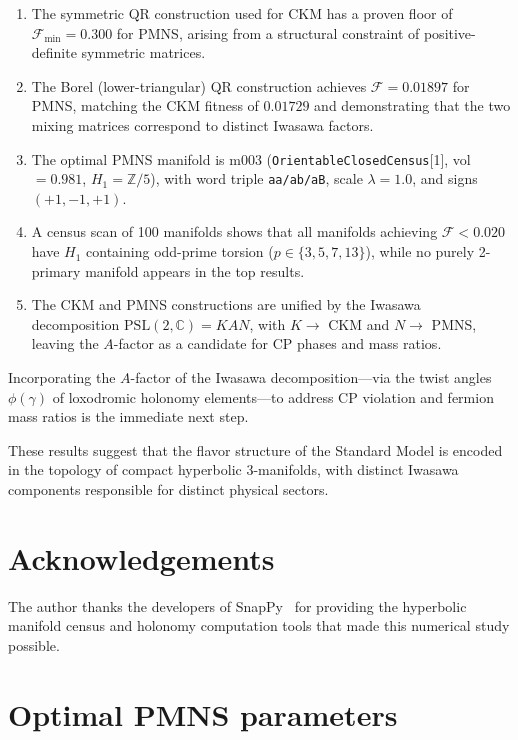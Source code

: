 \documentclass[11pt,a4paper]{article}
\newcommand{\PSL}{\mathrm{PSL}(2,\mathbb{C})}
\begin{document}
\begin{enumerate}
\item The symmetric QR construction used for CKM has a proven
floor of $\mathcal{F}_{\min} = 0.300$ for PMNS, arising from a
structural constraint of positive-definite symmetric matrices.

\item The Borel (lower-triangular) QR construction achieves
$\mathcal{F} = 0.01897$ for PMNS, matching the CKM fitness of
$0.01729$ and demonstrating that the two mixing matrices
correspond to distinct Iwasawa factors.

\item The optimal PMNS manifold is m003
(\texttt{OrientableClosedCensus}[1], vol $= 0.981$,
$H_1 = \mathbb{Z}/5$), with word triple \texttt{aa/ab/aB},
scale $\lambda = 1.0$, and signs $(+1, -1, +1)$.

\item A census scan of 100 manifolds shows that all manifolds
achieving $\mathcal{F} < 0.020$ have $H_1$ containing odd-prime
torsion ($p \in \{3, 5, 7, 13\}$), while no purely 2-primary manifold
appears in the top results.

\item The CKM and PMNS constructions are unified by the Iwasawa
decomposition $\PSL = KAN$, with $K \to$ CKM and $N \to$ PMNS,
leaving the $A$-factor as a candidate for CP phases and mass ratios.
\end{enumerate}

Incorporating the $A$-factor of the Iwasawa decomposition---via
the twist angles $\phi(\gamma)$ of loxodromic holonomy elements---to
address CP violation and fermion mass ratios is the immediate next step.

These results suggest that the flavor structure of the Standard Model
is encoded in the topology of compact hyperbolic 3-manifolds, with distinct Iwasawa components responsible for distinct physical sectors.

\section*{Acknowledgements}
The author thanks the developers of SnapPy~\cite{snappy} for
providing the hyperbolic manifold census and holonomy computation
tools that made this numerical study possible.


\appendix

\section{Optimal PMNS parameters}
\label{app:params}
\end{document}
